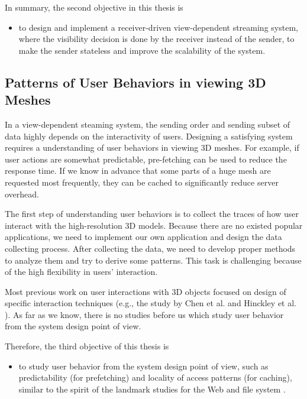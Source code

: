 \documentclass[11pt, a4paper]{report}
\begin{document}
    In summary, the second objective in this thesis is 
    \begin{itemize}
        \item
            to design and implement
            a receiver-driven view-dependent streaming system, where
            the visibility decision is done by the receiver instead of the sender,
            to make the sender stateless and improve the scalability of the system.
    \end{itemize}

    \subsection{Patterns of User Behaviors in viewing 3D Meshes}
    In a view-dependent steaming system, the sending order and sending subset 
    of data highly depends on the interactivity of users. 
    Designing a satisfying system
    requires a understanding of user behaviors in viewing 3D meshes.
    For example, if user actions are somewhat predictable, pre-fetching can 
    be used to reduce the response time. If we know in advance that some parts
    of a huge mesh are requested most frequently, they can be 
    cached to significantly reduce server overhead.

    The first step of understanding user behaviors is to collect the traces of 
    how user interact with the high-resolution 3D models. Because there are no
    existed popular applications, we need to implement our own application and
    design the data collecting process.
    After collecting the data, we need to develop proper methods to analyze them
    and try to derive some patterns. This task is challenging because of the high
    flexibility in users' interaction.
    
    Most previous work on user interactions with 3D objects focused on design
    of specific interaction techniques (e.g., the study by Chen et al. \cite{chen88study}
    and Hinckley et al. \cite{hinckley97usability}). 
    As far as we know, there is no studies before us which study user behavior
    from the system design point of view.
    
    Therefore, the third objective of this thesis is 
    \begin{itemize}
        \item
            to study user behavior from 
            the system design point of view, such as predictability (for prefetching)
            and locality of access patterns (for caching), similar to the spirit
            of the landmark studies for the Web \cite{huberman98web} and file system
            \cite {ousterhout85trace}. 
    \end{itemize}
\end{document}
